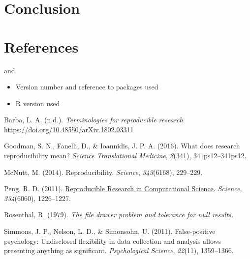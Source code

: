 \documentclass[
  british,
  a4paper,
]{article}
\newlength{\cslhangindent}
\newenvironment{CSLReferences}[2] %
 {\begin{list}{}{%
  \setlength{\itemindent}{0pt}
  \setlength{\leftmargin}{0pt}
  \setlength{\parsep}{0pt}
  \ifodd #1
   \setlength{\leftmargin}{\cslhangindent}
   \setlength{\itemindent}{-1\cslhangindent}
  \fi
  \setlength{\itemsep}{#2\baselineskip}}}
 {\end{list}}
\providecommand{\tightlist}{%
  \setlength{\itemsep}{0pt}\setlength{\parskip}{0pt}}
\begin{document}
\section{Conclusion}\label{conclusion}

\section{References}\label{references}

and

\begin{itemize}
\tightlist
\item
  Version number and reference to packages used
\item
  R version used
\end{itemize}

\label{refs}
\begin{CSLReferences}{1}{0}
Barba, L. A. (n.d.). \emph{Terminologies for reproducible research}.
\url{https://doi.org/10.48550/arXiv.1802.03311}

Goodman, S. N., Fanelli, D., \& Ioannidis, J. P. A. (2016). What does
research reproducibility mean? \emph{Science Translational Medicine},
\emph{8}(341), 341ps12--341ps12.

McNutt, M. (2014). Reproducibility. \emph{Science}, \emph{343}(6168),
229--229.

Peng, R. D. (2011).
\href{https://www.ncbi.nlm.nih.gov/pubmed/22144613}{Reproducible
{Research} in {Computational Science}}. \emph{Science},
\emph{334}(6060), 1226--1227.

Rosenthal, R. (1979). \emph{The file drawer problem and tolerance for
null results.}

Simmons, J. P., Nelson, L. D., \& Simonsohn, U. (2011). False-positive
psychology: {Undisclosed} flexibility in data collection and analysis
allows presenting anything as significant. \emph{Psychological Science},
\emph{22}(11), 1359--1366.

\end{CSLReferences}
\end{document}
